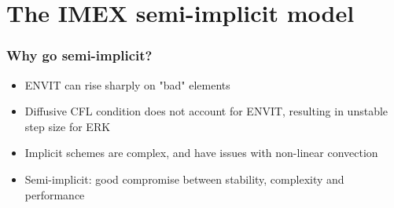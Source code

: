 
    
    \section{The IMEX semi-implicit model}
    

    \begin{frame}
		\frametitle{Why go semi-implicit?}
		\begin{itemize}
			\item ENVIT can rise sharply on "bad" elements
			\item Diffusive CFL condition does not account for ENVIT, resulting in unstable step size for ERK
			\item Implicit schemes are complex, and have issues with non-linear convection
			\item Semi-implicit: good compromise between stability, complexity and performance
		\end{itemize}
    \end{frame}
    
